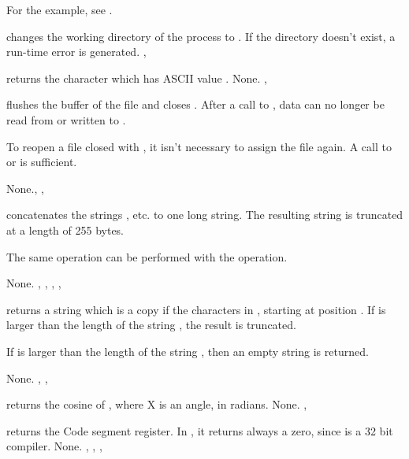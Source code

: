 \documentclass{report}
\begin{document}
For the example, see .

{ changes the working directory of the process to .}
{If the directory  doesn't exist, a run-time error is generated.}
{, }



{ returns the character which has ASCII value .}
{None.}
{,}



{ flushes the buffer of the file  and closes .
After a call to , data can no longer be read from or written to
.

To reopen a file closed with , it isn't necessary to assign the
file again. A call to  or  is sufficient.}
{None.}{, , }



{ concatenates the strings , etc. to one long
string. The resulting string is truncated at a length of 255 bytes.

The same operation can be performed with the \var{+} operation.}
{None.}
{, , , , }



{ returns a string which is a copy if the  characters
in , starting at position . If  is larger than
the length of the string , the result is truncated. 

If  is larger than the length of the string , then an
empty string is returned.}
{None.}
{, , }



{ returns the cosine of , where X is an angle, in radians.}
{None.}
{, }



{ returns the Code segment register. In \fpk, it returns always a
zero, since \fpk is a 32 bit compiler.}
{None.}
{, , , }
\end{document}

